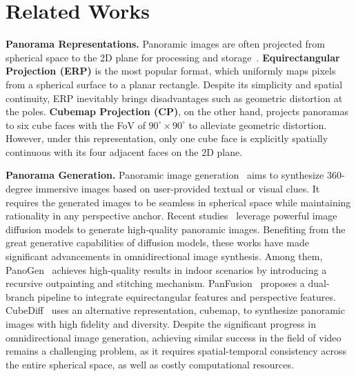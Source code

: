 \section{Related Works}
\noindent\textbf{Panorama Representations.} Panoramic images are often projected from spherical space to the 2D plane for processing and storage~\cite{ai2025survey}. 
%
\textbf{Equirectangular Projection (ERP)} is the most popular format, which uniformly maps pixels from a spherical surface to a planar rectangle.
%
Despite its simplicity and spatial continuity, ERP inevitably brings disadvantages such as geometric distortion at the poles.
%
\textbf{Cubemap Projection (CP)}, on the other hand, projects panoramas to six cube faces with the FoV of $90^\circ\times90^\circ$ to alleviate geometric distortion. 
%
However, under this representation, only one cube face is explicitly spatially continuous with its four adjacent faces on the 2D plane.


 
\noindent\textbf{Panorama Generation.} Panoramic image generation~\cite{kalischek2025cubediff,Tang2023mvdiffusion, wu2023panodiffusion, Ye2024DiffPano, feng2023diffusion360, chen2022text2light, liu2024panofree, panfusion2024, wang2023360, shum2023conditional, wang2024customizing, li2023panogen} aims to synthesize 360-degree immersive images based on user-provided textual or visual clues. 
%
It requires the generated images to be seamless in spherical space while maintaining rationality in any perspective anchor. 
%
Recent studies~\cite{kalischek2025cubediff,Tang2023mvdiffusion, wu2023panodiffusion, Ye2024DiffPano, panfusion2024, wang2023360, wang2024customizing, li2023panogen} leverage powerful image diffusion models to generate high-quality panoramic images. 
%
Benefiting from the great generative capabilities of diffusion models, these works have made significant advancements in omnidirectional image synthesis.
%
Among them, PanoGen~\cite{li2023panogen} achieves high-quality results in indoor scenarios by introducing a recursive outpainting and stitching mechanism. 
%
PanFusion~\cite{panfusion2024} proposes a dual-branch pipeline to integrate equirectangular features and perspective features.
%
CubeDiff~\cite{kalischek2025cubediff} uses an alternative representation, cubemap, to synthesize panoramic images with high fidelity and diversity.
%
Despite the significant progress in omnidirectional image generation, achieving similar success in the field of video remains a challenging problem, as it requires spatial-temporal consistency across the entire spherical space, as well as costly computational resources.


